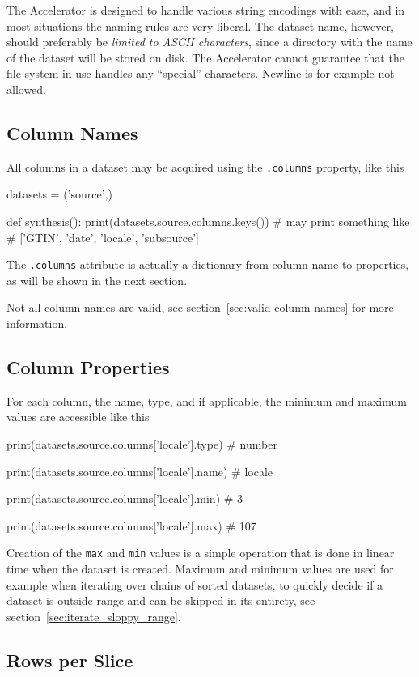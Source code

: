 The Accelerator is designed to handle various string encodings with
ease, and in most situations the naming rules are very liberal.  The
dataset name, however, should preferably be \textsl{limited to ASCII
characters}, since a directory with the name of the dataset will be
stored on disk.  The Accelerator cannot guarantee that the file system
in use handles any ``special'' characters.  Newline is for example not
allowed.


\subsection{Column Names}
All columns in a dataset may be acquired using the \texttt{.columns}
property, like this
\begin{python}
datasets = ('source',)

def synthesis():
    print(datasets.source.columns.keys())
    # may print something like
    # ['GTIN', 'date', 'locale', 'subsource']
\end{python}
The \texttt{.columns} attribute is actually a dictionary from column
name to properties, as will be shown in the next section.

Not all column names are valid, see
section~\ref{sec:valid-column-names} for more information.

\subsection{Column Properties}
For each column, the name, type, and if applicable, the minimum and
maximum values are accessible like this
\begin{python}
print(datasets.source.columns['locale'].type)
# number

print(datasets.source.columns['locale'].name)
# locale

print(datasets.source.columns['locale'].min)
# 3

print(datasets.source.columns['locale'].max)
# 107
\end{python}
Creation of the \texttt{max} and \texttt{min} values is a simple
operation that is done in linear time when the dataset is created.
Maximum and minimum values are used for example when iterating over
chains of sorted datasets, to quickly decide if a dataset is outside
range and can be skipped in its entirety, see
section~\ref{sec:iterate_sloppy_range}.


\subsection{Rows per Slice}


